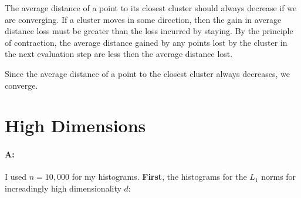 \documentclass[11pt]{article}
\begin{document}
The average distance of a point to its closest cluster should always decrease if we are converging. If a cluster moves in some direction, then the gain in average distance loss must be greater than the loss incurred by staying. By the principle of contraction, the average distance gained by any points lost by the cluster in the next evaluation step are less then the average distance lost.

Since the average distance of a point to the closest cluster always decreases, we converge.




\section{High Dimensions}

\paragraph{A:} 

I used $n=10,000$ for my histograms. \textbf{First}, the histograms for the $L_1$ norms for increadingly high dimensionality $d$:
\end{document}
